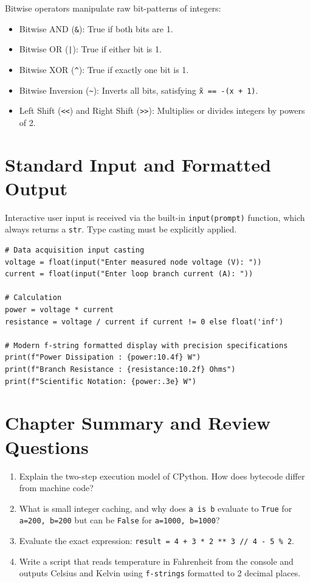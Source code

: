 Bitwise operators manipulate raw bit-patterns of integers:
\begin{itemize}[leftmargin=1.8em, itemsep=2pt]
    \item Bitwise AND (\texttt{\&}): True if both bits are 1.
    \item Bitwise OR (\texttt{|}): True if either bit is 1.
    \item Bitwise XOR (\texttt{\^{}}): True if exactly one bit is 1.
    \item Bitwise Inversion (\texttt{\~{}}): Inverts all bits, satisfying \texttt{\~{x} == -(x + 1)}.
    \item Left Shift (\texttt{<<}) and Right Shift (\texttt{>>}): Multiplies or divides integers by powers of 2.
\end{itemize}

\section{Standard Input and Formatted Output}

Interactive user input is received via the built-in \texttt{input(prompt)} function, which always returns a \texttt{str}. Type casting must be explicitly applied.

\begin{lstlisting}[caption={Engineering I/O and Modern String Formatting (f-strings)}]
# Data acquisition input casting
voltage = float(input("Enter measured node voltage (V): "))
current = float(input("Enter loop branch current (A): "))

# Calculation
power = voltage * current
resistance = voltage / current if current != 0 else float('inf')

# Modern f-string formatted display with precision specifications
print(f"Power Dissipation : {power:10.4f} W")
print(f"Branch Resistance : {resistance:10.2f} Ohms")
print(f"Scientific Notation: {power:.3e} W")
\end{lstlisting}

\section{Chapter Summary and Review Questions}
\begin{enumerate}[leftmargin=1.8em, itemsep=4pt]
    \item Explain the two-step execution model of CPython. How does bytecode differ from machine code?
    \item What is small integer caching, and why does \texttt{a is b} evaluate to \texttt{True} for \texttt{a=200, b=200} but can be \texttt{False} for \texttt{a=1000, b=1000}?
    \item Evaluate the exact expression: \texttt{result = 4 + 3 * 2 ** 3 // 4 - 5 \% 2}.
    \item Write a script that reads temperature in Fahrenheit from the console and outputs Celsius and Kelvin using \texttt{f-strings} formatted to 2 decimal places.
\end{enumerate}
